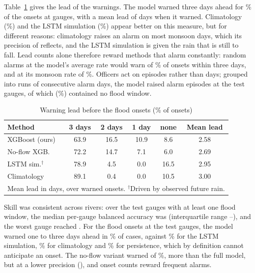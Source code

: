 \documentclass[conference]{IEEEtran}
\begin{document}
Table~\ref{tab:warn} gives the lead of the warnings. The model warned three days ahead for \WarnThreeXgb\% of the \EvN{} onsets at \EvGauges{} gauges, with a mean lead of \MeanLeadXgb{} days when it warned. Climatology (\WarnThreeClim\%) and the LSTM simulation (\WarnThreeLstm\%) appear better on this measure, but for different reasons: climatology raises an alarm on most monsoon days, which its precision of \ClimPrec{} reflects, and the LSTM simulation is given the rain that is still to fall. Lead counts alone therefore reward methods that alarm constantly: random alarms at the model's average rate would warn of \RandWarn\% of onsets within three days, and at its monsoon rate of \RandWarnMon\%. Officers act on episodes rather than days; grouped into runs of consecutive alarm days, the model raised \EpN{} alarm episodes at the test gauges, of which \EpFalse{} (\EpFalsePct\%) contained no flood window.

\begin{table}[t]
\caption{Warning lead before the \EvN{} flood onsets (\% of onsets)}
\label{tab:warn}
\centering
\footnotesize
\setlength{\tabcolsep}{3pt}
\begin{tabular}{lccccc}
\toprule
Method & 3 days & 2 days & 1 day & none & Mean lead\\
\midrule
XGBoost (ours) & 63.9 & 16.5 & 10.9 & 8.6 & 2.58\\
No-flow XGB. & 72.2 & 14.7 & 7.1 & 6.0 & 2.69\\
LSTM sim.$^\dagger$ & 78.9 & 4.5 & 0.0 & 16.5 & 2.95\\
Climatology & 89.1 & 0.4 & 0.0 & 10.5 & 3.00\\
\bottomrule
\multicolumn{6}{l}{\scriptsize Mean lead in days, over warned onsets. $^\dagger$Driven by observed future rain.}\\
\end{tabular}
\end{table}

Skill was consistent across rivers: over the \PgN{} test gauges with at least one flood window, the median per-gauge balanced accuracy was \PgMed{} (interquartile range \PgQOne--\PgQThree), and the worst gauge reached \PgMin. For the \EvN{} flood onsets at the test gauges, the model warned one to three days ahead in \EvXgbWarn\% of cases, against \EvLstmWarn\% for the LSTM simulation, \EvClimWarn\% for climatology and \EvPersWarn\% for persistence, which by definition cannot anticipate an onset. The no-flow variant warned of \EvNoFlowWarn\%, more than the full model, but at a lower precision (\NoFlowPrec), and onset counts reward frequent alarms.
\end{document}
